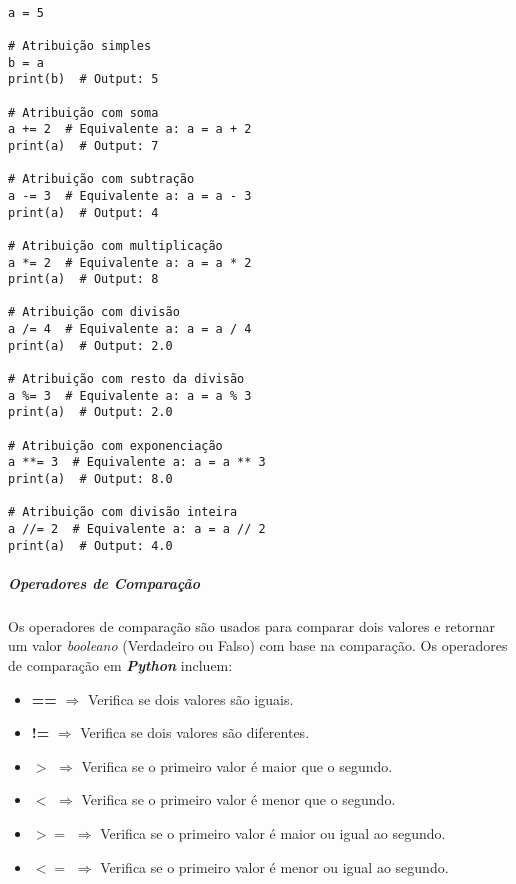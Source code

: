 \documentclass[a4paper, 12pt, onecolumn,singlespacing]{article}
\begin{document}
\begin{verbatim}

a = 5

# Atribuição simples
b = a
print(b)  # Output: 5

# Atribuição com soma
a += 2  # Equivalente a: a = a + 2
print(a)  # Output: 7

# Atribuição com subtração
a -= 3  # Equivalente a: a = a - 3
print(a)  # Output: 4

# Atribuição com multiplicação
a *= 2  # Equivalente a: a = a * 2
print(a)  # Output: 8
				
# Atribuição com divisão
a /= 4  # Equivalente a: a = a / 4
print(a)  # Output: 2.0

# Atribuição com resto da divisão
a %= 3  # Equivalente a: a = a % 3
print(a)  # Output: 2.0

# Atribuição com exponenciação
a **= 3  # Equivalente a: a = a ** 3
print(a)  # Output: 8.0

# Atribuição com divisão inteira
a //= 2  # Equivalente a: a = a // 2
print(a)  # Output: 4.0

\end{verbatim}
\label{operadores_de_atribuicao}
	
	\subparagraph{Operadores de Comparação}
	\label{python_operadores_comparacao}
	Os operadores de comparação são usados para comparar dois valores e retornar um valor \textit{booleano} (Verdadeiro ou Falso) com base na comparação. Os operadores de comparação em \textbf{\textit{Python}} incluem:
	
	\begin{itemize}
		\item \textbf{==} $\Rightarrow$ Verifica se dois valores são iguais.
		\item \textbf{!=} $\Rightarrow$ Verifica se dois valores são diferentes.
		\item \textbf{$>$} $\Rightarrow$ Verifica se o primeiro valor é maior que o segundo.
		\item \textbf{$<$} $\Rightarrow$ Verifica se o primeiro valor é menor que o segundo.
		\item \textbf{$>=$} $\Rightarrow$ Verifica se o primeiro valor é maior ou igual ao segundo.
		\item \textbf{$<=$} $\Rightarrow$ Verifica se o primeiro valor é menor ou igual ao segundo.
	\end{itemize}
\end{document}
